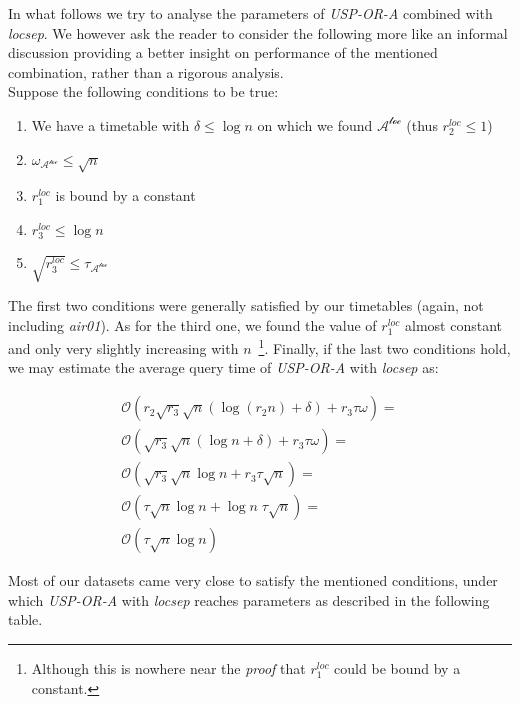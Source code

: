 		\noindent In what follows we try to analyse the parameters of \textit{USP-OR-A} combined with \textit{locsep}. We however ask the reader to consider the following more like an informal discussion providing a better insight on performance of the mentioned combination, rather than a rigorous analysis. \\
		
		\noindent Suppose the following conditions to be true:
		\begin{enumerate}
			\item We have a timetable with $\delta \leq \log n$ on which we found $\mathcal{A^{loc}}$ (thus $r_{2}^{loc} \leq 1$)
			\item $\omega_{\mathcal{A^{loc}}} \leq \sqrt{n}$
			\item $r_{1}^{loc}$ is bound by a constant
			\item $r_{3}^{loc} \leq \log n$
			\item $\sqrt{r_{3}^{loc}} \leq \tau_{\mathcal{A^{loc}}}$
		\end{enumerate}
		\hspace{\fill}
		
		\noindent The first two conditions were generally satisfied by our timetables (again, not including \textit{air01}). As for the third one, we found the value of $r_{1}^{loc}$ almost constant and only very slightly increasing with $n$~\footnote{Although this is nowhere near the \textit{proof} that $r_{1}^{loc}$ could be bound by a constant.}. Finally, if the last two conditions hold, we may estimate the average query time of \textit{USP-OR-A} with \textit{locsep} as:
		
		\begin{align*}
			\mathcal{O}(r_{2} \sqrt{r_{3}} \sqrt{n} (\log (r_{2}n) + \delta) + r_{3} \tau \omega) = \\
			\mathcal{O}(\sqrt{r_{3}} \sqrt{n} (\log n + \delta) + r_{3} \tau \omega) = \\
			\mathcal{O}(\sqrt{r_{3}} \sqrt{n} \log n + r_{3} \tau \sqrt{n}) = \\
			\mathcal{O}(\tau \sqrt{n} \log n + \log n \; \tau \sqrt{n}) = \\
			\mathcal{O}(\tau \sqrt{n} \log n)
		\end{align*}
		
		\noindent Most of our datasets came very close to satisfy the mentioned conditions, under which \textit{USP-OR-A} with \textit{locsep} reaches parameters as described in the following table.
		
